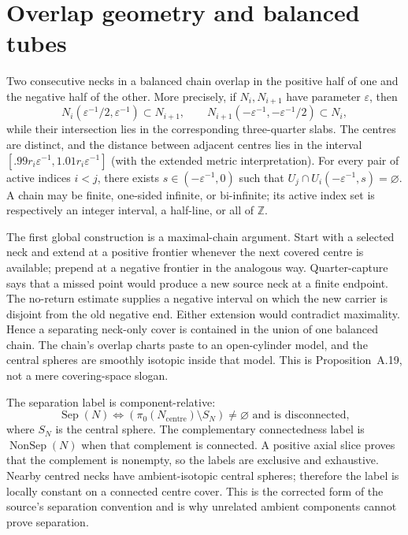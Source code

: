\section{Overlap geometry and balanced tubes}
\label{sec:balanced-tubes}

Two consecutive necks in a balanced chain overlap in the positive half of one
and the negative half of the other.  More precisely, if $N_i,N_{i+1}$ have
parameter $\varepsilon$, then
\[
 N_i(\varepsilon^{-1}/2,\varepsilon^{-1})\subset N_{i+1},\qquad
 N_{i+1}(-\varepsilon^{-1},-\varepsilon^{-1}/2)\subset N_i,
\]
while their intersection lies in the corresponding three-quarter slabs.
The centres are distinct, and the distance between adjacent centres lies in
the interval $[.99r_i\varepsilon^{-1},1.01r_i\varepsilon^{-1}]$ (with the
extended metric interpretation).  For every pair of active indices $i<j$,
there exists $s\in(-\varepsilon^{-1},0)$ such that
$U_j\cap U_i(-\varepsilon^{-1},s)=\varnothing$.  A chain may be finite,
one-sided infinite, or bi-infinite; its active index set is respectively an
integer interval, a half-line, or all of $\mathbb Z$.

The first global construction is a maximal-chain argument.  Start with a
selected neck and extend at a positive frontier whenever the next covered
centre is available; prepend at a negative frontier in the analogous way.
Quarter-capture says that a missed point would produce a new source neck at a
finite endpoint.  The no-return estimate supplies a negative interval on
which the new carrier is disjoint from the old negative end.  Either extension
would contradict maximality.  Hence a separating neck-only cover is contained
in the union of one balanced chain.  The chain's overlap charts paste to an
open-cylinder model, and the central spheres are smoothly isotopic inside that
model.  This is Proposition~A.19, not a mere covering-space slogan.

The separation label is component-relative:
\[
 \operatorname{Sep}(N)\iff
 (\pi_0(N_\mathrm{centre})\setminus S_N)\ne\varnothing
 \text{ and is disconnected},
\]
where $S_N$ is the central sphere.  The complementary connectedness label is
\(\operatorname{NonSep}(N)\) when that complement is connected.  A positive
axial slice proves that the complement is nonempty, so the labels are
exclusive and exhaustive.  Nearby centred necks have ambient-isotopic central
spheres; therefore the label is locally constant on a connected centre cover.
This is the corrected form of the source's separation convention and is why
unrelated ambient components cannot prove separation.


